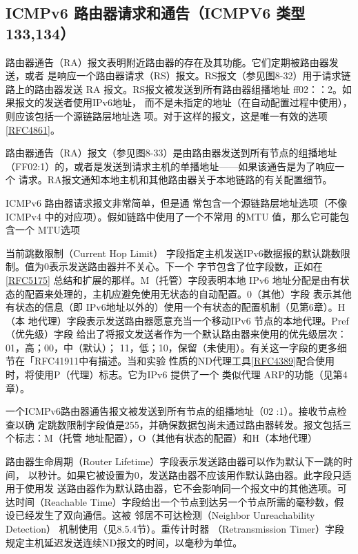 \subsection{ICMPv6 路由器请求和通告（ICMPV6 类型 133,134）}
路由器通告（RA）报文表明附近路由器的存在及其功能。它们定期被路由器发送，或者
是响应一个路由器请求（RS）报文。RS报文（参见图8-32）用于请求链路上的路由器发送
RA 报文。RS报文被发送到所有路由器组播地址 ff02：：2。如果报文的发送者使用IPv6地址，
而不是未指定的地址（在自动配置过程中使用），则应该包括一个源链路层地址选
项。对于这样的报文，这是唯一有效的选项 \href{https://www.rfc-editor.org/rfc/rfc4861}{[RFC4861]}。

路由器通告（RA）报文（参见图8-33）是由路由器发送到所有节点的组播地址
（FF02:1）的，或者是发送到请求主机的单播地址——如果该通告是为了响应一个
请求。RA报文通知本地主机和其他路由器关于本地链路的有关配置细节。

ICMPv6 路由器请求报文非常简单，但是通
常包含一个源链路层地址选项（不像ICMPv4
中的对应项）。假如链路中使用了一个不常用
的MTU 值，那么它可能包含一个 MTU选项

当前跳数限制（Current Hop Limit）
字段指定主机发送IPv6数据报的默认跳数限制。值为0表示发送路由器并不关心。下一个
字节包含了位字段数，正如在\href{https://www.rfc-editor.org/rfc/rfc5175}{[RFC5175]}
总结和扩展的那样。M（托管）字段表明本地 IPv6
地址分配是由有状态的配置来处理的，主机应避免使用无状态的自动配置。0（其他）字段
表示其他有状态的信息（即 IPv6地址以外的）使用一个有状态的配置机制（见第6章）。H（本
地代理）字段表示发送路由器愿意充当一个移动IPv6 节点的本地代理。Pref（优先级）字段
给出了将报文发送者作为一个默认路由器来使用的优先级层次：01，高；00，中（默认）；
11，低；10，保留（未使用）。有关这一字段的更多细节在「RFC41911中有描述。当和实验
性质的ND代理工具\href{https://www.rfc-editor.org/rfc/rfc4389}{[RFC4389]}配合使用时，将使用P（代理）标志。它为IPv6
提供了一个
类似代理 ARP的功能（见第4章）。

一个ICMPv6路由器通告报文被发送到所有节点的组播地址（02 :1）。接收节点检查以确
定跳数限制字段值是255，并确保数据包尚未通过路由器转发。报文包括三个标志：M（托管
地址配置），O（其他有状态的配置）和H（本地代理）

路由器生命周期（Router Lifetime）字段表示发送路由器可以作为默认下一跳的时间，
以秒计。如果它被设置为0，发送路由器不应该用作默认路由器。此字段只适用于使用发
送路由器作为默认路由器，它不会影响同一个报文中的其他选项。可达时间（Reachable
Time）字段给出一个节点到达另一个节点所需的毫秒数，假设已经发生了双向通信。这被
邻居不可达检测（Neighbor Unreachability Detection） 机制使用（见8.5.4节）。重传计时器
（Retransmission Timer）字段规定主机延迟发送连续ND报文的时间，以毫秒为单位。

